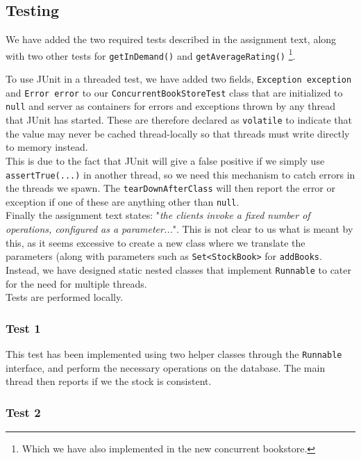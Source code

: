 \documentclass[11pt]{article}
\begin{document}
\subsection*{Testing}

We have added the two required tests described in the assignment text, along
with two other tests for \texttt{getInDemand()} and \texttt{getAverageRating()}
\footnote{Which we have also implemented in the new concurrent bookstore.}.

To use JUnit in a threaded test, we have added two fields,
\texttt{Exception exception} and \texttt{Error error}
to our \texttt{ConcurrentBookStoreTest} class that are initialized
to {\tt null} and server as containers for errors and exceptions thrown by any thread that
JUnit has started. These are therefore declared as \texttt{volatile} to indicate that the 
value may never be cached thread-locally so that threads must write directly to
memory instead.\\
This is due to the fact that JUnit will give a false positive if we simply
use \texttt{assertTrue(...)} in another thread, so we need this mechanism to
catch errors in the threads we spawn.
The \texttt{tearDownAfterClass} will then report the error or exception if one
of these are anything other than \texttt{null}.\\

Finally the assignment text states: "\emph{the clients invoke a fixed number of operations,
configured as a parameter...}". This is not clear to us what is meant by this, as
it seems excessive to create a new class where we translate the parameters (along with
parameters such as \texttt{Set<StockBook>} for \texttt{addBooks}. Instead, we have
designed static nested classes that implement \texttt{Runnable} to cater for the
need for multiple threads.\\

Tests are performed locally.

\subsubsection*{Test 1}

This test has been implemented using two helper classes through the \texttt{Runnable}
interface, and perform the necessary operations on the database. The main thread
then reports if we the stock is consistent.

\subsubsection*{Test 2}
\end{document}
